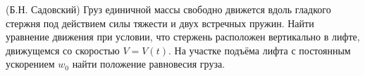 (Б.Н. Садовский)
Груз единичной массы свободно движется вдоль гладкого стержня
под действием силы тяжести и двух встречных пружин. Найти уравнение
движения при условии, что стержень расположен вертикально в лифте,
движущемся со скоростью $V=V(t)$. На участке подъёма лифта с постоянным
ускорением $w_{0}$ найти положение равновесия груза.
